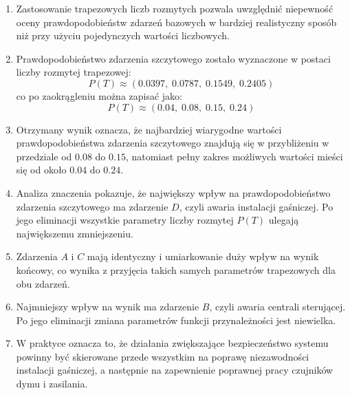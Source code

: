\documentclass[11pt,a4paper]{article}
\begin{document}
\begin{enumerate}
\item Zastosowanie trapezowych liczb rozmytych pozwala uwzględnić niepewność oceny prawdopodobieństw zdarzeń bazowych w bardziej realistyczny sposób niż przy użyciu pojedynczych wartości liczbowych.

\item Prawdopodobieństwo zdarzenia szczytowego zostało wyznaczone w postaci liczby rozmytej trapezowej:
\[
P(T)\approx(0.0397,\;0.0787,\;0.1549,\;0.2405)
\]
co po zaokrągleniu można zapisać jako:
\[
P(T)\approx(0.04,\;0.08,\;0.15,\;0.24)
\]

\item Otrzymany wynik oznacza, że najbardziej wiarygodne wartości prawdopodobieństwa zdarzenia szczytowego znajdują się w przybliżeniu w przedziale od $0.08$ do $0.15$, natomiast pełny zakres możliwych wartości mieści się od około $0.04$ do $0.24$.

\item Analiza znaczenia pokazuje, że największy wpływ na prawdopodobieństwo zdarzenia szczytowego ma zdarzenie $D$, czyli awaria instalacji gaśniczej. Po jego eliminacji wszystkie parametry liczby rozmytej $P(T)$ ulegają największemu zmniejszeniu.

\item Zdarzenia $A$ i $C$ mają identyczny i umiarkowanie duży wpływ na wynik końcowy, co wynika z przyjęcia takich samych parametrów trapezowych dla obu zdarzeń.

\item Najmniejszy wpływ na wynik ma zdarzenie $B$, czyli awaria centrali sterującej. Po jego eliminacji zmiana parametrów funkcji przynależności jest niewielka.

\item W praktyce oznacza to, że działania zwiększające bezpieczeństwo systemu powinny być skierowane przede wszystkim na poprawę niezawodności instalacji gaśniczej, a następnie na zapewnienie poprawnej pracy czujników dymu i zasilania.
\end{enumerate}
\end{document}
